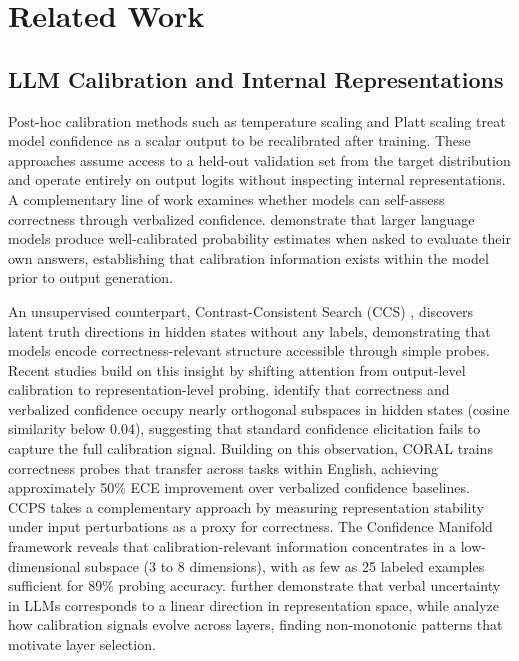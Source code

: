 
\section{Related Work}

\subsection{LLM Calibration and Internal Representations}

Post-hoc calibration methods such as temperature scaling \cite{guo2017calibration} and Platt scaling \cite{niculescu2005predicting} treat model confidence as a scalar output to be recalibrated after training. These approaches assume access to a held-out validation set from the target distribution and operate entirely on output logits without inspecting internal representations.
A complementary line of work examines whether models can self-assess correctness through verbalized confidence. \citet{kadavath2022language} demonstrate that larger language models produce well-calibrated probability estimates when asked to evaluate their own answers, establishing that calibration information exists within the model prior to output generation.

An unsupervised counterpart, Contrast-Consistent Search (CCS) \citep{burns2023ccs}, discovers latent truth directions in hidden states without any labels, demonstrating that models encode correctness-relevant structure accessible through simple probes. Recent studies build on this insight by shifting attention from output-level calibration to representation-level probing. \citet{miao2026closing} identify that correctness and verbalized confidence occupy nearly orthogonal subspaces in hidden states (cosine similarity below 0.04), suggesting that standard confidence elicitation fails to capture the full calibration signal. Building on this observation, CORAL \cite{miao2026coral} trains correctness probes that transfer across tasks within English, achieving approximately 50\% ECE improvement over verbalized confidence baselines. CCPS \cite{khanmohammadi2025ccps} takes a complementary approach by measuring representation stability under input perturbations as a proxy for correctness. The Confidence Manifold framework \cite{confidence_manifold2026} reveals that calibration-relevant information concentrates in a low-dimensional subspace (3 to 8 dimensions), with as few as 25 labeled examples sufficient for 89\% probing accuracy. \citet{ji2025calibrating} further demonstrate that verbal uncertainty in LLMs corresponds to a linear direction in representation space, while \citet{joshi2025calibration} analyze how calibration signals evolve across layers, finding non-monotonic patterns that motivate layer selection.

